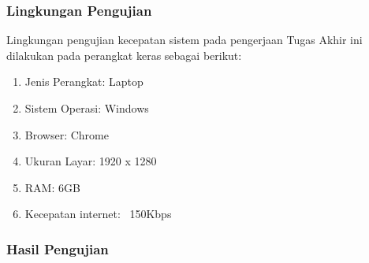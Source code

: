 
	\subsubsection{Lingkungan Pengujian}
	Lingkungan pengujian kecepatan sistem pada pengerjaan Tugas Akhir ini dilakukan pada perangkat keras sebagai berikut: 
		\begin{enumerate}[label=\alph*.]
			\item Jenis Perangkat: Laptop
			\item Sistem Operasi: Windows
			\item Browser: Chrome
			\item Ukuran Layar: 1920 x 1280
			\item RAM: 6GB
			\item Kecepatan internet: ~150Kbps
		\end{enumerate}
	
	\subsubsection{Hasil Pengujian}
